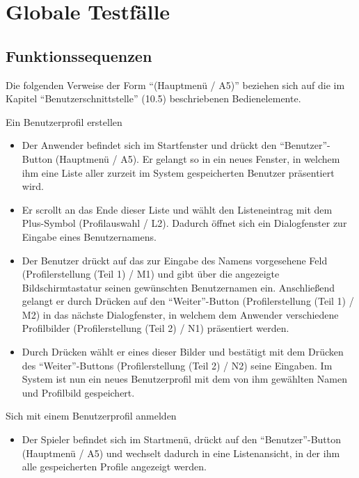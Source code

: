 \section{Globale Testfälle}

\subsection{Funktionssequenzen}

Die folgenden Verweise der Form "`(Hauptmenü / A5)"' beziehen sich auf die im Kapitel "`Benutzerschnittstelle"'  (10.5) beschriebenen Bedienelemente.

\begin{requirements}

	 Ein Benutzerprofil erstellen
	
	
	\begin{itemize}
  			\item Der Anwender befindet sich im Startfenster und drückt den "`Benutzer"'-Button (Hauptmenü / A5). Er gelangt so in ein neues Fenster, in welchem ihm eine Liste aller zurzeit im System gespeicherten Benutzer präsentiert wird.
  			
  			\item Er scrollt an das Ende dieser Liste und wählt den Listeneintrag mit dem Plus-Symbol (Profilauswahl / L2). Dadurch öffnet sich ein Dialogfenster zur Eingabe eines Benutzernamens.
  			
  			\item Der Benutzer drückt auf das zur Eingabe des Namens vorgesehene Feld (Profilerstellung (Teil 1) / M1) und gibt über die angezeigte Bildschirmtastatur seinen gewünschten Benutzernamen ein. Anschließend gelangt er durch Drücken auf den "`Weiter"'-Button (Profilerstellung (Teil 1) / M2) in das nächste Dialogfenster, in welchem dem Anwender verschiedene Profilbilder (Profilerstellung (Teil 2) / N1) präsentiert werden.
  			
  			\item Durch Drücken wählt er eines dieser Bilder und bestätigt mit dem Drücken des "`Weiter"'-Buttons (Profilerstellung (Teil 2) / N2) seine Eingaben. Im System ist nun ein neues Benutzerprofil mit dem von ihm gewählten Namen und Profilbild gespeichert.
  	\end{itemize}
  	
  	
  	
  	 Sich mit einem Benutzerprofil anmelden
  	
  	\begin{itemize}
  			\item Der Spieler befindet sich im Startmenü, drückt auf den "`Benutzer"'-Button (Hauptmenü / A5) und wechselt dadurch in eine Listenansicht, in der ihm alle gespeicherten Profile angezeigt werden.
  			

\end{itemize}
\end{requirements}
